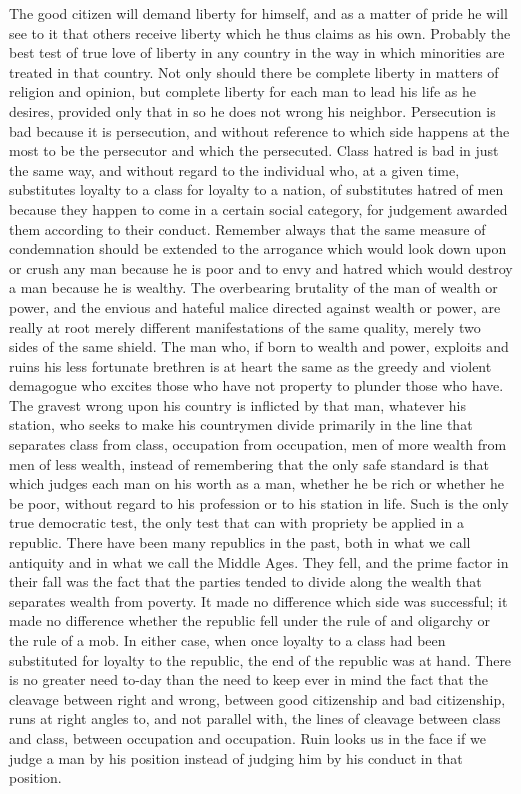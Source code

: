 \documentclass[a4paper]{amsbook}
\begin{document}
The good citizen will demand liberty for himself, and as a matter of pride he will see to it that others receive liberty which he thus claims as his own. Probably the best test of true love of liberty in any country in the way in which minorities are treated in that country. Not only should there be complete liberty in matters of religion and opinion, but complete liberty for each man to lead his life as he desires, provided only that in so he does not wrong his neighbor. Persecution is bad because it is persecution, and without reference to which side happens at the most to be the persecutor and which the persecuted. Class hatred is bad in just the same way, and without regard to the individual who, at a given time, substitutes loyalty to a class for loyalty to a nation, of substitutes hatred of men because they happen to come in a certain social category, for judgement awarded them according to their conduct. Remember always that the same measure of condemnation should be extended to the arrogance which would look down upon or crush any man because he is poor and to envy and hatred which would destroy a man because he is wealthy. The overbearing brutality of the man of wealth or power, and the envious and hateful malice directed against wealth or power, are really at root merely different manifestations of the same quality, merely two sides of the same shield. The man who, if born to wealth and power, exploits and ruins his less fortunate brethren is at heart the same as the greedy and violent demagogue who excites those who have not property to plunder those who have. The gravest wrong upon his country is inflicted by that man, whatever his station, who seeks to make his countrymen divide primarily in the line that separates class from class, occupation from occupation, men of more wealth from men of less wealth, instead of remembering that the only safe standard is that which judges each man on his worth as a man, whether he be rich or whether he be poor, without regard to his profession or to his station in life. Such is the only true democratic test, the only test that can with propriety be applied in a republic. There have been many republics in the past, both in what we call antiquity and in what we call the Middle Ages. They fell, and the prime factor in their fall was the fact that the parties tended to divide along the wealth that separates wealth from poverty. It made no difference which side was successful; it made no difference whether the republic fell under the rule of and oligarchy or the rule of a mob. In either case, when once loyalty to a class had been substituted for loyalty to the republic, the end of the republic was at hand. There is no greater need to-day than the need to keep ever in mind the fact that the cleavage between right and wrong, between good citizenship and bad citizenship, runs at right angles to, and not parallel with, the lines of cleavage between class and class, between occupation and occupation. Ruin looks us in the face if we judge a man by his position instead of judging him by his conduct in that position.
\end{document}
